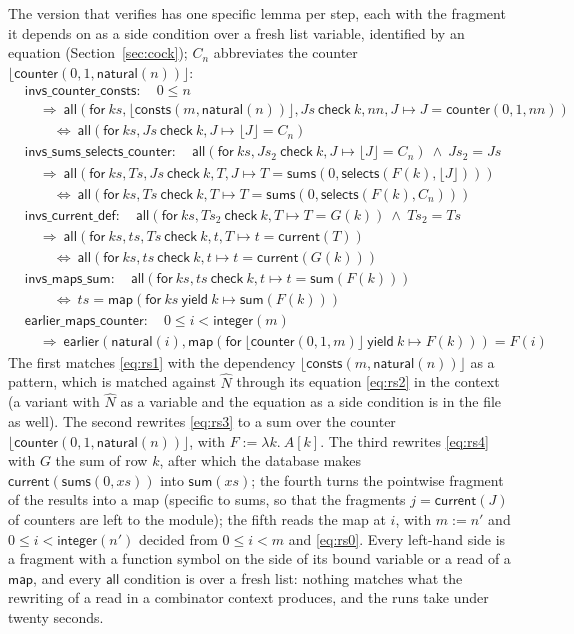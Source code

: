 \documentclass[11pt,a4paper]{article}
\newcommand{\bl}[1]{\lfloor #1\rfloor}                       %
\newcommand{\mapc}[2]{\mathsf{map}(\mathsf{for}\ #1\ \mathsf{yield}\ #2)}
\newcommand{\al}[2]{\mathsf{all}(\mathsf{for}\ #1\ \mathsf{check}\ #2)}
\newcommand{\cnt}{\mathsf{counter}}
\newcommand{\cur}{\mathsf{current}}
\newcommand{\intf}{\mathsf{integer}}
\newcommand{\natf}{\mathsf{natural}}
\newcommand{\sums}{\mathsf{sums}}
\newcommand{\lemma}[1]{\textsf{#1}}
\newcommand{\seq}[1]{\hat{#1}}                               %
\begin{document}
The version that verifies has one specific lemma per step, each with the fragment it depends on as a side
condition over a fresh list variable, identified by an equation (Section~\ref{sec:cock}); $C_n$ abbreviates
the counter $\bl{\cnt(0, 1, \natf(n))}$:
\begin{align*}
  &\lemma{invs\_counter\_consts}:\quad 0 \le n\\
  &\quad\Longrightarrow\ \al{ks, \bl{\mathsf{consts}(m, \natf(n))}, Js}{k, nn, J \mapsto J = \cnt(0, 1, nn)}\\
  &\qquad\Longleftrightarrow\ \al{ks, Js}{k, J \mapsto \bl{J} = C_n}\\[2pt]
  &\lemma{invs\_sums\_selects\_counter}:\quad \al{ks, Js_2}{k, J \mapsto \bl{J} = C_n}\ \wedge\ Js_2 = Js\\
  &\quad\Longrightarrow\ \al{ks, Ts, Js}{k, T, J \mapsto T = \sums(0, \mathsf{selects}(F(k), \bl{J}))}\\
  &\qquad\Longleftrightarrow\ \al{ks, Ts}{k, T \mapsto T = \sums(0, \mathsf{selects}(F(k), C_n))}\\[2pt]
  &\lemma{invs\_current\_def}:\quad \al{ks, Ts_2}{k, T \mapsto T = G(k)}\ \wedge\ Ts_2 = Ts\\
  &\quad\Longrightarrow\ \al{ks, ts, Ts}{k, t, T \mapsto t = \cur(T)}\\
  &\qquad\Longleftrightarrow\ \al{ks, ts}{k, t \mapsto t = \cur(G(k))}\\[2pt]
  &\lemma{invs\_maps\_sum}:\quad \al{ks, ts}{k, t \mapsto t = \mathsf{sum}(F(k))}\\
  &\qquad\Longleftrightarrow\ ts = \mapc{ks}{k \mapsto \mathsf{sum}(F(k))}\\[2pt]
  &\lemma{earlier\_maps\_counter}:\quad 0 \le i < \intf(m)\\
  &\quad\Longrightarrow\ \mathsf{earlier}(\natf(i), \mapc{\bl{\cnt(0, 1, m)}}{k \mapsto F(k)}) = F(i)
\end{align*}
The first matches \eqref{eq:rs1} with the dependency $\bl{\mathsf{consts}(m, \natf(n))}$ as a pattern,
which is matched against $\seq{N}$ through its equation \eqref{eq:rs2} in the context (a variant with
$\seq{N}$ as a variable and the equation as a side condition is in the file as well). The second rewrites
\eqref{eq:rs3} to a sum over the counter $\bl{\cnt(0, 1, \natf(n))}$, with $F := \lambda k.\ A[k]$. The third
rewrites \eqref{eq:rs4} with $G$ the sum of row $k$, after which the database makes $\cur(\sums(0, xs))$ into
$\mathsf{sum}(xs)$; the fourth turns the pointwise fragment of the results
into a map (specific to sums, so that the fragments $j = \cur(J)$ of counters are left to the module); the
fifth reads the map at $i$, with $m := n'$ and $0 \le i < \intf(n')$ decided from $0 \le i < m$ and
\eqref{eq:rs0}. Every left-hand side is a fragment with a function symbol on the side of its bound variable
or a read of a $\mathsf{map}$, and every $\mathsf{all}$ condition is over a fresh list: nothing matches what
the rewriting of a read in a combinator context produces, and the runs take under twenty seconds.
\end{document}
